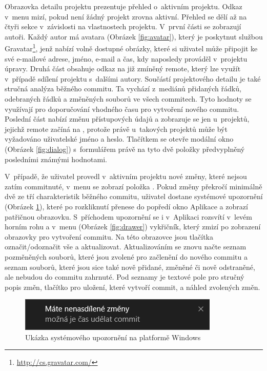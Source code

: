 Obrazovka detailu projektu prezentuje přehled o~aktivním projektu. Odkaz v~menu mizí, pokud není žádný projekt zrovna aktivní. Přehled se dělí až na čtyři sekce v~závislosti na vlastnostech projektu. V~první části se zobrazují autoři. Každý autor má avatara (Obrázek \ref{fig:avatar}), který je poskytnut službou Gravatar\footnote{\url{http://cs.gravatar.com/}}, jenž nabízí volně dostupné obrázky, které si uživatel může připojit ke své e-mailové adrese, jméno, e-mail a čas, kdy naposledy prováděl v~projektu úpravy. Druhá část obsahuje odkaz na již zmíněný remote, který lze využít v~případě sdílení projektu s~dalšími autory. Součástí projektového detailu je také stručná analýza běžného commitu. Ta vychází z~mediánů přidaných řádků, odebraných řádků a změněných souborů ve všech commitech. Tyto hodnoty se využívají pro doporučování vhodného času pro vytvoření nového commitu. Poslední část nabízí změnu přístupových údajů a zobrazuje se jen u~projektů, jejichž remote začíná na , protože právě u~takových projektů může být vyžadováno uživatelské jméno a heslo. Tlačítkem  se otevře modální okno (Obrázek \ref{fig:dialog}) s~formulářem právě na tyto dvě položky předvyplněný posledními známými hodnotami.

V~případě, že uživatel provedl v~aktivním projektu nové změny, které nejsou zatím commitnuté, v~menu se zobrazí položka . Pokud změny překročí minimálně dvě ze tří charakteristik běžného commitu, uživatel dostane systémové upozornění (Obrázek \ref{fig:notification}), které po rozkliknutí přenese do popředí okno Aplikace a zobrazí patřičnou obrazovku. S~příchodem upozornění se i v~Aplikaci rozsvítí v~levém horním rohu a v~menu (Obrázek \ref{fig:drawer}) vykřičník, který zmizí po zobrazení obrazovky pro vytvoření commitu. Na této obrazovce jsou tlačítka označit/odoznačit vše a aktualizovat. Aktualizováním se znovu načte seznam pozměněných souborů, které jsou zvolené pro začlenění do nového commitu a seznam souborů, které jsou sice také nově přidané, změněné či nově odstraněné, ale nebudou do commitu zahrnuté. Pod seznamy je textové pole pro stručný popis změn, tlačítko pro uložení, které vytvoří commit, a náhled zvolených změn.

\FloatBarrier
\begin{figure}[ht]
	\centering
	\includegraphics[scale=0.65]{sections/ui/images/notification.png}
	\caption[Systémové upozornění]{Ukázka systémového upozornění na platformě Windows}
	\label{fig:notification}
\end{figure}
\FloatBarrier

